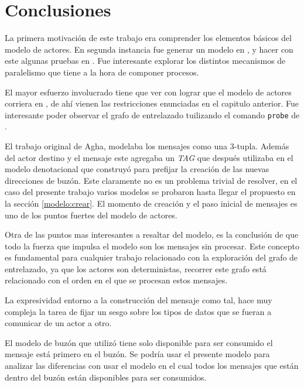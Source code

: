 \chapter{Conclusiones}

La primera motivación de este trabajo era comprender los elementos básicos del modelo de actores. En segunda instancia fue generar un modelo en \CSP, y hacer con este algunas pruebas en \FDR. Fue interesante explorar los distintos mecanismos de paralelismo que tiene \CSP a la hora de componer procesos.

El mayor esfuerzo involucrado tiene que ver con lograr que el modelo de actores corriera en \FDR, de ahí vienen las restricciones enunciadas en el capitulo anterior. Fue interesante poder observar el grafo de entrelazado tuilizando el comando \verb=probe= de \FDR. 

El trabajo original de Agha\cite{Agha:1986:AMC:7929}, modelaba los mensajes como una 3-tupla. Además del actor destino y el mensaje este agregaba un \textit{TAG} que después utilizaba en el modelo denotacional que construyó para prefijar la creación de las nuevas direcciones de buzón. Este claramente no es un problema trivial de resolver, en el caso del presente trabajo varios modelos se probaron hasta llegar el propuesto en la sección \ref{modelo:crear}. El momento de creación y el paso inicial de mensajes es uno de los puntos fuertes del modelo de actores.

Otra de las puntos mas interesantes a resaltar del modelo, es la conclusión de que todo la fuerza que impulsa el modelo son los mensajes sin procesar. Este concepto es fundamental para cualquier trabajo relacionado con la exploración del grafo de entrelazado, ya que los actores son deterministas, recorrer este grafo está relacionado con el orden en el que se procesan estos mensajes.

La expresividad entorno a la construcción del mensaje como tal, hace muy compleja la tarea de fijar un sesgo sobre los tipos de datos que se fueran a comunicar de un actor a otro.

El modelo de buzón que utilizó tiene solo disponible para ser consumido el mensaje está primero en el buzón. Se podría usar el presente modelo para analizar las diferencias con usar el modelo en el cual todos los mensajes que están dentro del buzón están disponibles para ser consumidos.


